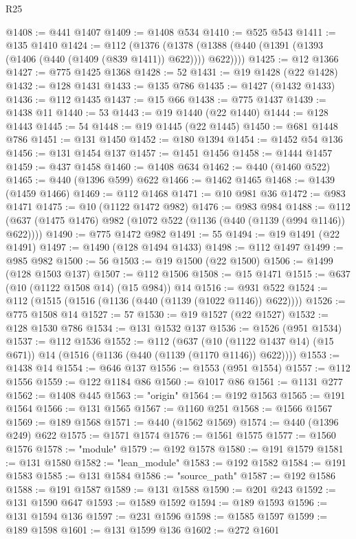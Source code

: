 \begin{lexlean}{R25}
\begin{coremodule}
@1408 := @441 @1407
@1409 := @1408 @534
@1410 := @525 @543
@1411 := @135 @1410
@1424 := @112
    (@1376 (@1378 (@1388 (@440 (@1391 (@1393 (@1406 (@440 (@1409 (@839 @1411)) @622)))) @622))))
@1425 := @12 @1366
@1427 := @775 @1425 @1368
@1428 := 52
@1431 := @19 @1428 (@22 @1428)
@1432 := @128 @1431
@1433 := @135 @786
@1435 := @1427 (@1432 @1433)
@1436 := @112 @1435
@1437 := @15 @66
@1438 := @775 @1437
@1439 := @1438 @11
@1440 := 53
@1443 := @19 @1440 (@22 @1440)
@1444 := @128 @1443
@1445 := 54
@1448 := @19 @1445 (@22 @1445)
@1450 := @681 @1448 @786
@1451 := @131 @1450
@1452 := @180 @1394
@1454 := @1452 @54 @136
@1456 := @131 @1454 @137
@1457 := @1451 @1456
@1458 := @1444 @1457
@1459 := @437 @1458
@1460 := @1408 @634
@1462 := @440 (@1460 @522)
@1465 := @440 (@1396 @599) @622
@1466 := @1462 @1465
@1468 := @1439 (@1459 @1466)
@1469 := @112 @1468
@1471 := @10 @981 @36
@1472 := @983 @1471
@1475 := @10 (@1122 @1472 @982)
@1476 := @983 @984
@1488 := @112 (@637 (@1475 @1476) @982 (@1072 @522 (@1136 (@440 (@1139 (@994 @1146)) @622))))
@1490 := @775 @1472 @982
@1491 := 55
@1494 := @19 @1491 (@22 @1491)
@1497 := @1490 (@128 @1494 @1433)
@1498 := @112 @1497
@1499 := @985 @982
@1500 := 56
@1503 := @19 @1500 (@22 @1500)
@1506 := @1499 (@128 @1503 @137)
@1507 := @112 @1506
@1508 := @15 @1471
@1515 := @637 (@10 (@1122 @1508 @14) (@15 @984)) @14
@1516 := @931 @522
@1524 := @112 (@1515 (@1516 (@1136 (@440 (@1139 (@1022 @1146)) @622))))
@1526 := @775 @1508 @14
@1527 := 57
@1530 := @19 @1527 (@22 @1527)
@1532 := @128 @1530 @786
@1534 := @131 @1532 @137
@1536 := @1526 (@951 @1534)
@1537 := @112 @1536
@1552 := @112
    (@637 (@10 (@1122 @1437 @14) (@15 @671)) @14 (@1516 (@1136 (@440 (@1139 (@1170 @1146)) @622))))
@1553 := @1438 @14
@1554 := @646 @137
@1556 := @1553 (@951 @1554)
@1557 := @112 @1556
@1559 := @122 @1184 @86
@1560 := @1017 @86
@1561 := @1131 @277
@1562 := @1408 @445
@1563 := "origin"
@1564 := @192 @1563
@1565 := @191 @1564
@1566 := @131 @1565
@1567 := @1160 @251
@1568 := @1566 @1567
@1569 := @189 @1568
@1571 := @440 (@1562 @1569)
@1574 := @440 (@1396 @249) @622
@1575 := @1571 @1574
@1576 := @1561 @1575
@1577 := @1560 @1576
@1578 := "module"
@1579 := @192 @1578
@1580 := @191 @1579
@1581 := @131 @1580
@1582 := "lean_module"
@1583 := @192 @1582
@1584 := @191 @1583
@1585 := @131 @1584
@1586 := "source_path"
@1587 := @192 @1586
@1588 := @191 @1587
@1589 := @131 @1588
@1590 := @201 @243
@1592 := @131 @1590 @647
@1593 := @1589 @1592
@1594 := @189 @1593
@1596 := @131 @1594 @136
@1597 := @231 @1596
@1598 := @1585 @1597
@1599 := @189 @1598
@1601 := @131 @1599 @136
@1602 := @272 @1601

\end{coremodule}
\end{lexlean}
